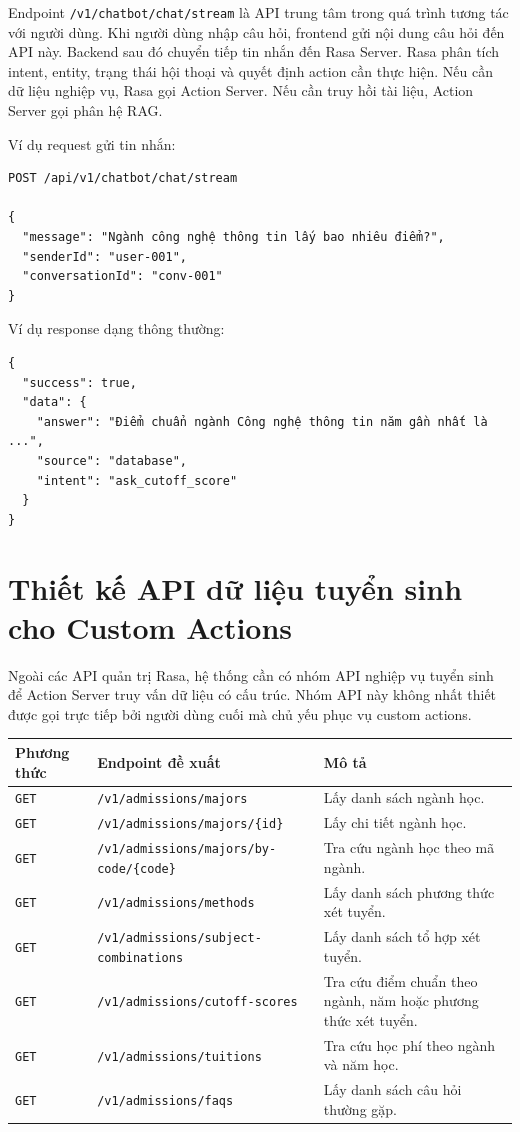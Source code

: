 Endpoint \texttt{/v1/chatbot/chat/stream} là API trung tâm trong quá trình tương tác với người dùng. Khi người dùng nhập câu hỏi, frontend gửi nội dung câu hỏi đến API này. Backend sau đó chuyển tiếp tin nhắn đến Rasa Server. Rasa phân tích intent, entity, trạng thái hội thoại và quyết định action cần thực hiện. Nếu cần dữ liệu nghiệp vụ, Rasa gọi Action Server. Nếu cần truy hồi tài liệu, Action Server gọi phân hệ RAG.

Ví dụ request gửi tin nhắn:

\begin{verbatim}
POST /api/v1/chatbot/chat/stream

{
  "message": "Ngành công nghệ thông tin lấy bao nhiêu điểm?",
  "senderId": "user-001",
  "conversationId": "conv-001"
}
\end{verbatim}

Ví dụ response dạng thông thường:

\begin{verbatim}
{
  "success": true,
  "data": {
    "answer": "Điểm chuẩn ngành Công nghệ thông tin năm gần nhất là ...",
    "source": "database",
    "intent": "ask_cutoff_score"
  }
}
\end{verbatim}

\section{Thiết kế API dữ liệu tuyển sinh cho Custom Actions}

Ngoài các API quản trị Rasa, hệ thống cần có nhóm API nghiệp vụ tuyển sinh để Action Server truy vấn dữ liệu có cấu trúc. Nhóm API này không nhất thiết được gọi trực tiếp bởi người dùng cuối mà chủ yếu phục vụ custom actions.

\begin{longtable}{|p{3cm}|p{5cm}|p{7cm}|}
\hline
\textbf{Phương thức} & \textbf{Endpoint đề xuất} & \textbf{Mô tả} \\
\hline
\texttt{GET} & \texttt{/v1/admissions/majors} & Lấy danh sách ngành học. \\
\hline
\texttt{GET} & \texttt{/v1/admissions/majors/\{id\}} & Lấy chi tiết ngành học. \\
\hline
\texttt{GET} & \texttt{/v1/admissions/majors/by-code/\{code\}} & Tra cứu ngành học theo mã ngành. \\
\hline
\texttt{GET} & \texttt{/v1/admissions/methods} & Lấy danh sách phương thức xét tuyển. \\
\hline
\texttt{GET} & \texttt{/v1/admissions/subject-combinations} & Lấy danh sách tổ hợp xét tuyển. \\
\hline
\texttt{GET} & \texttt{/v1/admissions/cutoff-scores} & Tra cứu điểm chuẩn theo ngành, năm hoặc phương thức xét tuyển. \\
\hline
\texttt{GET} & \texttt{/v1/admissions/tuitions} & Tra cứu học phí theo ngành và năm học. \\
\hline
\texttt{GET} & \texttt{/v1/admissions/faqs} & Lấy danh sách câu hỏi thường gặp. \\
\hline
\end{longtable}

